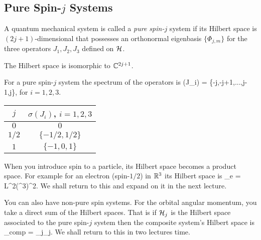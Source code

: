 \subsection{Pure Spin-$j$ Systems}

\bd 
A quantum mechanical system is called a \emph{pure spin-$j$} system if its Hilbert space is $(2j+1)$-dimensional that possesses an orthonormal eigenbasis $\{\Phi_{j,m}\}$ for the three operators $J_1,J_2,J_3$ defined on $\mathcal{H}$.
\ed 

\bc 
The Hilbert space is isomorphic to $\mathbb{C}^{2j+1}$.
\ec 

\bc 
For a pure spin-$j$ system the spectrum of the operators is 
\bse
\sigma(J_i) = \{-j,-j+1,...,j-1,j\},
\ese 
for $i=1,2,3$.
\ec 

\be 
\hfill 

\begin{center}
    \begin{tabular}{c|c}
        $j$ & $\sigma(J_i)$, $i=1,2,3$ \\
         \hline $0$ & $0$ \\
         $1/2$ & $\{-1/2,1/2\}$ \\
         $1$ & $\{-1,0,1\}$
    \end{tabular}
\end{center}
\ee 

\br 
\label{rem:ElectronCompositeHilbert}
When you introduce spin to a particle, its Hilbert space becomes a product space. For example for an electron (spin-$1/2$) in $\mathbb{R}^3$ its Hilbert space is 
\bse
\cH_{e} = L^2(\R^3)\otimes \C^2.
\ese 
We shall return to this and expand on it in the next lecture.
\er 

\br 
You can also have non-pure spin systems. For the orbital angular momentum, you take a direct sum of the Hilbert spaces. That is if $\mathcal{H}_j$ is the Hilbert space associated to the pure spin-$j$ system then the composite system's Hilbert space is 
\bse 
\cH_{comp} = \bigoplus_{j}\cH_j.
\ese 
We shall return to this in two lectures time.
\er 